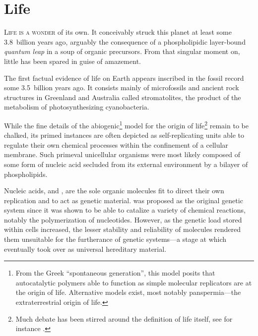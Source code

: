 \section{Life}

\textsc{Life is a wonder} of its own.  It conceivably struck this planet at
least some 3.8~billion years ago,\cite{mojzsis_evidence_1996} arguably the
consequence of a phospholipidic \mbox{layer-bound} \emph{quantum leap} in a soup
of organic precursors.\cite{miller_organic_1959} From that singular moment on,
little has been spared in guise of amazement.

\bigskip


The first factual evidence of life on Earth appears inscribed in the fossil
record some 3.5~billion years ago.  It consists mainly of microfossils and
ancient rock structures in Greenland and Australia called
stromatolites,\cite{ohtomo_evidence_2014,noffke_microbially_2013} the product of
the metabolism of photosynthesizing cyanobacteria.

While the fine details of the abiogenic\footnote{From the Greek ``spontaneous
  generation'', this model posits that autocatalytic polymers able to function
  as simple molecular replicators are at the origin of life.  Alternative models
  exist, most notably panspermia---the extraterrestrial origin of life.} model
for the origin of life\footnote{Much debate has been stirred around the
  definition of life itself, see for instance \citealp{benner_defining_2010}.}
remain to be chalked, its primed instances are often depicted as
\mbox{self-replicating} units able to regulate their own chemical processes
within the confinement of a cellular membrane.  Such primeval unicellular
organisms were most likely composed of some form of nucleic acid secluded from
its external environment by a bilayer of phospholipids.

Nucleic acids,  and , are the sole organic
molecules fit to direct their own replication and to act as genetic material.
 was proposed as the original genetic system since it was shown
to be able to catalize a variety of chemical reactions, notably the
polymerization of nucleotides.\cite{bass_specific_1984} However, as the genetic
load stored within cells increased, the lesser stability and reliability of
 molecules rendered them unsuitable for the furtherance of
genetic systems---a stage at which  eventually took over as
universal hereditary material.


